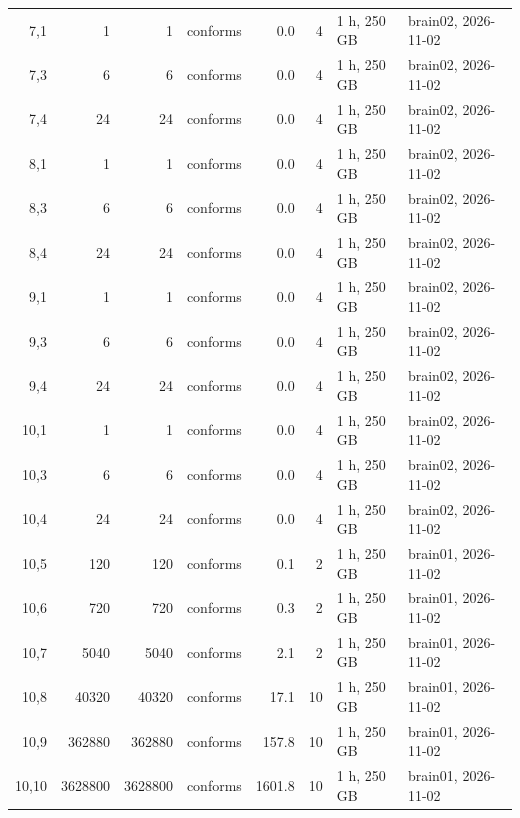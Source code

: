 \documentclass[10pt]{article}
\begin{document}
\begin{longtable}{@{}rrrlrrll@{}}
\color{blue} 7,1 & 1 & 1 & conforms & 0.0 & 4 & 1 h, 250 GB & brain02, 2026-11-02 \\
\color{blue} 7,3 & 6 & 6 & conforms & 0.0 & 4 & 1 h, 250 GB & brain02, 2026-11-02 \\
\color{blue} 7,4 & 24 & 24 & conforms & 0.0 & 4 & 1 h, 250 GB & brain02, 2026-11-02 \\
\color{blue} 8,1 & 1 & 1 & conforms & 0.0 & 4 & 1 h, 250 GB & brain02, 2026-11-02 \\
\color{blue} 8,3 & 6 & 6 & conforms & 0.0 & 4 & 1 h, 250 GB & brain02, 2026-11-02 \\
\color{blue} 8,4 & 24 & 24 & conforms & 0.0 & 4 & 1 h, 250 GB & brain02, 2026-11-02 \\
\color{blue} 9,1 & 1 & 1 & conforms & 0.0 & 4 & 1 h, 250 GB & brain02, 2026-11-02 \\
\color{blue} 9,3 & 6 & 6 & conforms & 0.0 & 4 & 1 h, 250 GB & brain02, 2026-11-02 \\
\color{blue} 9,4 & 24 & 24 & conforms & 0.0 & 4 & 1 h, 250 GB & brain02, 2026-11-02 \\
\color{blue} 10,1 & 1 & 1 & conforms & 0.0 & 4 & 1 h, 250 GB & brain02, 2026-11-02 \\
\color{blue} 10,3 & 6 & 6 & conforms & 0.0 & 4 & 1 h, 250 GB & brain02, 2026-11-02 \\
\color{blue} 10,4 & 24 & 24 & conforms & 0.0 & 4 & 1 h, 250 GB & brain02, 2026-11-02 \\
\color{blue} 10,5 & 120 & 120 & conforms & 0.1 & 2 & 1 h, 250 GB & brain01, 2026-11-02 \\
\color{blue} 10,6 & 720 & 720 & conforms & 0.3 & 2 & 1 h, 250 GB & brain01, 2026-11-02 \\
\color{blue} 10,7 & 5040 & 5040 & conforms & 2.1 & 2 & 1 h, 250 GB & brain01, 2026-11-02 \\
\color{blue} 10,8 & 40320 & 40320 & conforms & 17.1 & 10 & 1 h, 250 GB & brain01, 2026-11-02 \\
\color{blue} 10,9 & 362880 & 362880 & conforms & 157.8 & 10 & 1 h, 250 GB & brain01, 2026-11-02 \\
\color{blue} 10,10 & 3628800 & 3628800 & conforms & 1601.8 & 10 & 1 h, 250 GB & brain01, 2026-11-02 \\
\bottomrule
\end{longtable}
\end{document}
